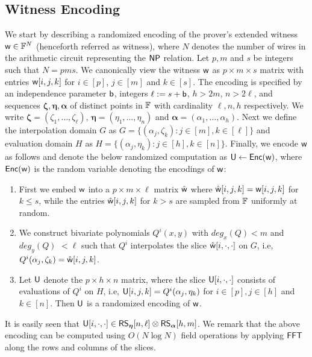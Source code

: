 \subsection{Witness Encoding}\label{subsec:witencoding}
We start by describing a randomized encoding of the prover's extended witness $\mathsf{w}\in \mathbb{F}^N$ (henceforth referred as witness), where $N$ denotes the number of wires in the arithmetic circuit representing the $\mathsf{NP}$ relation. Let $p,m$ and $s$ be integers such that $N=pms$. We canonically view the witness $\mathsf{w}$ as $p\times m\times s$ matrix with entries $\mathsf{w}[i,j,k]$ for $i\in [p]$, $j\in [m]$ and $k\in [s]$. The encoding is specified by an independence parameter $\mathsf{b}$, integers $\ell := s+\mathsf{b}$, $h>2m$, $n>2\ell$, and sequences $\bm{\zeta},\bm{\eta},\bm{\alpha}$ of distinct points in $\mathbb{F}$ with cardinality $\ell,n,h$ respectively. We write $\bm{\zeta}=(\zeta_1,\ldots,\zeta_\ell)$, $\bm{\eta}=(\eta_1,\ldots,\eta_n)$ and $\bm{\alpha}=(\alpha_1,\ldots,\alpha_h)$. 
Next we define the interpolation domain $G$ as $G=\{(\alpha_j,\zeta_k): j\in[m], k\in [\ell]\}$ and evaluation domain $H$ as $H=\{(\alpha_j,\eta_k): j\in [h],
k\in [n]\}$. Finally, we encode $\mathsf{w}$ as follows and denote the below randomized computation as $\mathsf{U}\leftarrow \mathsf{Enc}(\mathsf{w})$, where  $\mathsf{Enc}(\mathsf{w})$ is the random variable denoting the encodings of $\mathsf{w}$:
\begin{enumerate}[{\rm (i)}]
	\item First we embed $\mathsf{w}$ into a $p\times m\times \ell$ matrix $\hat{\mathsf{w}}$ where $\hat{\mathsf{w}}[i,j,k]=\mathsf{w}[i,j,k]$ for $k\leq s$, while the entries $\hat{\mathsf{w}}[i,j,k]$ for $k>s$ are sampled from $\mathbb{F}$ uniformly at random.
	\item We construct bivariate polynomials $Q^i(x,y)$ with $deg_x(Q)<m$ and $deg_y(Q) $ $<\ell$ such that $Q^i$ interpolates the slice $\hat{\mathsf{w}}[i,\cdot,\cdot]$ on $G$, i.e,
	$Q^i(\alpha_j,\zeta_k)=\hat{\mathsf{w}}[i,j,k]$.
	\item Let $\mathsf{U}$ denote the $p\times h\times n$ matrix, where the slice $\mathsf{U}[i,\cdot,\cdot]$ consists of evaluations of $Q^i$ on $H$, i.e, $\mathsf{U}[i,j,k]=Q^i(\alpha_j,\eta_k)$ for $i\in [p], j\in [h]$ and $k\in [n]$. Then $\mathsf{U}$ is a randomized encoding of $\mathsf{w}$.
\end{enumerate}
It is easily seen that $\mathsf{U}[i,\cdot,\cdot]\in \mathsf{RS}_{\bm{\eta}}[n,\ell]\otimes \mathsf{RS}_{\bm{\alpha}}[h,m]$. We remark that the above encoding can be computed using $O(N\log N)$ field operations by applying $\mathsf{FFT}$ along the rows and columns of the slices.

